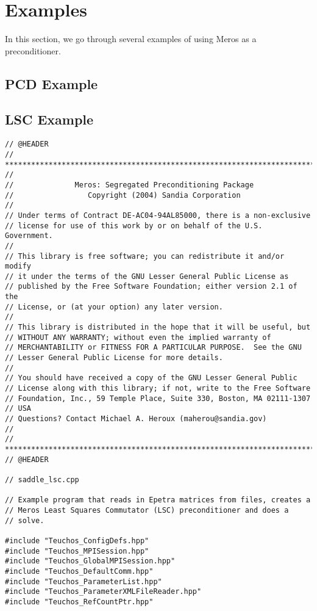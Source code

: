 \section{Examples}

In this section, we go through several examples of using Meros as a
preconditioner. 

\subsection{PCD Example}

\subsection{LSC Example}

\begin{verbatim}
// @HEADER
// ***********************************************************************
// 
//              Meros: Segregated Preconditioning Package
//                 Copyright (2004) Sandia Corporation
// 
// Under terms of Contract DE-AC04-94AL85000, there is a non-exclusive
// license for use of this work by or on behalf of the U.S. Government.
// 
// This library is free software; you can redistribute it and/or modify
// it under the terms of the GNU Lesser General Public License as
// published by the Free Software Foundation; either version 2.1 of the
// License, or (at your option) any later version.
//  
// This library is distributed in the hope that it will be useful, but
// WITHOUT ANY WARRANTY; without even the implied warranty of
// MERCHANTABILITY or FITNESS FOR A PARTICULAR PURPOSE.  See the GNU
// Lesser General Public License for more details.
//  
// You should have received a copy of the GNU Lesser General Public
// License along with this library; if not, write to the Free Software
// Foundation, Inc., 59 Temple Place, Suite 330, Boston, MA 02111-1307
// USA
// Questions? Contact Michael A. Heroux (maherou@sandia.gov) 
// 
// ***********************************************************************
// @HEADER

// saddle_lsc.cpp

// Example program that reads in Epetra matrices from files, creates a
// Meros Least Squares Commutator (LSC) preconditioner and does a
// solve.

#include "Teuchos_ConfigDefs.hpp"
#include "Teuchos_MPISession.hpp"
#include "Teuchos_GlobalMPISession.hpp"
#include "Teuchos_DefaultComm.hpp"
#include "Teuchos_ParameterList.hpp"
#include "Teuchos_ParameterXMLFileReader.hpp"
#include "Teuchos_RefCountPtr.hpp"


\end{verbatim}
